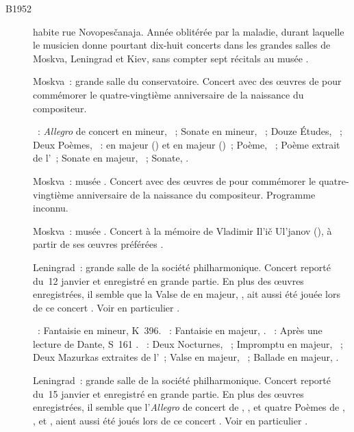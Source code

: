 \begin{description}
 \item[B1952]
 \VSofronitsky{} habite rue Novopesčanaja.
 Année oblitérée par la maladie, durant laquelle le musicien donne pourtant
 dix-huit concerts dans les grandes salles de Moskva, Leningrad et Kiev,
 sans compter sept récitals au musée \Scriabine{}.
 \item[]
 Moskva~: grande salle du conservatoire.
 Concert avec des œuvres de \Scriabine{} pour commémorer le quatre-vingtième
 anniversaire de la naissance du compositeur.

 \textsc{\Scriabine{}}~: \emph{Allegro} de concert en \kB \Flat mineur,
 ~; Sonate en \kF \Sharp mineur, ~; Douze Études,
 ~; Deux Poèmes, ~: en \kD majeur () et en \kF
 \Sharp majeur ()~; Poème,  ~; Poème extrait de
 l'~; Sonate en \kF \Sharp majeur, ~; Sonate, .
 \item[]
 Moskva~: musée \Scriabine{}.
 Concert avec des œuvres de \Scriabine{} pour commémorer le quatre-vingtième
 anniversaire de la naissance du compositeur.
 Programme inconnu.
 \item[]
 Moskva~: musée \Scriabine{}.
 Concert à la mémoire de Vladimir Il'ič Ul'janov (\Lenin{}), à partir de ses
 œuvres préférées \citep[voir][p.~172]{Nekrasova08}.
 \item[]
 Leningrad~: grande salle de la société philharmonique.
 Concert reporté du~12 janvier et enregistré en grande partie.
 En plus des œuvres enregistrées, il semble que la Valse de \Chopin{} en \kD
 \Flat majeur,  , ait aussi été jouée lors de ce concert
 \citep[p.~57]{White}.
 Voir en particulier \citet[p.~444]{Milshteyn82a}.

 \textsc{\Mozart{}}~: Fantaisie en \kC mineur, K~396.
 \textsc{\Schumann{}}~: Fantaisie en \kC majeur, .
 \textsc{\Liszt{}}~: Après une lecture de Dante, S~161 .
 \textsc{\Chopin{}}~: Deux Nocturnes, ~; Impromptu en \kG \Flat
 majeur, ~; Deux Mazurkas extraites de l'~; Valse
  en \kD \Flat majeur,  ~; Ballade en \kA
 \Flat majeur, .
 \item[]
 Leningrad~: grande salle de la société philharmonique.
 Concert reporté du~15 janvier et enregistré en grande partie.
 En plus des œuvres enregistrées, il semble que l'\emph{Allegro} de concert
 de \Scriabine{}, , et quatre Poèmes de \Scriabine{}, ,
  et , aient aussi été joués lors de ce concert
 \citep[p.~57-58]{White}.
 Voir en particulier \citet[p.~444]{Milshteyn82a}.


\end{description}
